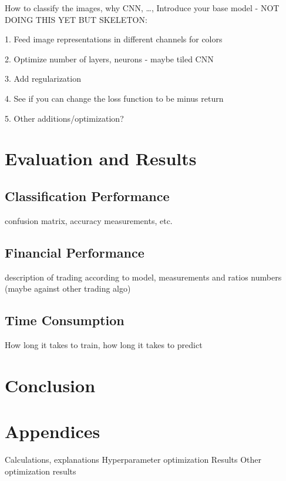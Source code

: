 \documentclass[11pt, a4paper]{article}
\begin{document}
How to classify the images, why CNN, \dots, 
Introduce your base model - NOT DOING THIS YET BUT SKELETON:

1. Feed image representations in different channels for colors

2. Optimize number of layers, neurons - maybe tiled CNN

3. Add regularization

4. See if you can change the loss function to be minus return

5. Other additions/optimization?

\section{Evaluation and Results}

\subsection{Classification Performance}
confusion matrix, accuracy measurements, etc.

\subsection{Financial Performance}
description of trading according to model, measurements and ratios
numbers (maybe against other trading algo)

\subsection{Time Consumption}
How long it takes to train, how long it takes to predict

\section{Conclusion}

\section{Appendices}
Calculations, explanations
Hyperparameter optimization Results
Other optimization results



\end{document}
